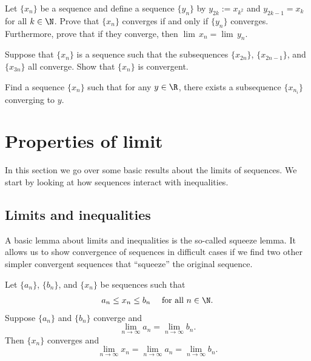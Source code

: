 \documentclass[12pt]{book}
\begin{document}
\begin{exercise}
Let $\{ x_n \}$ be a sequence and
define a sequence $\{ y_n \}$ by
$y_{2k} := x_{k^2}$ and $y_{2k-1} = x_k$ for all $k \in \N$.
Prove that $\{ x_n \}$ converges if and only if $\{ y_n \}$ converges.
Furthermore, prove that if they converge, then
$\lim\, x_n = \lim\, y_n$.
\end{exercise}

\begin{exercise}
Suppose that $\{ x_n \}$ is a sequence such that
the subsequences $\{ x_{2n} \}$, $\{ x_{2n-1} \}$, and
$\{ x_{3n} \}$ all converge.
Show that $\{ x_n \}$ is convergent.
\end{exercise}

\begin{exercise}
Find a sequence $\{ x_n \}$ such that for any $y \in \R$, there exists a
subsequence $\{ x_{n_i} \}$ converging to $y$.
\end{exercise}


\sectionnewpage
\section{Properties of limit}
\label{sec:factslimsseqs}


In this section we go over some basic results about the limits of
sequences.
We start by looking at how sequences interact with inequalities.

\subsection*{Limits and inequalities}

A basic lemma about limits and inequalities is the so-called squeeze lemma.
It allows us to show convergence of sequences in difficult cases
if we find two other simpler convergent sequences that 
``squeeze'' the original sequence.

\begin{lemma} \label{squeeze:lemma}
Let $\{ a_n \}$, 
$\{ b_n \}$, and 
$\{ x_n \}$ be sequences such that
\begin{equation*}
a_n \leq x_n \leq b_n \quad \text{ for all $n \in \N$} .
\end{equation*}
Suppose $\{ a_n \}$ and $\{ b_n \}$ converge and
\begin{equation*}
\lim_{n\to \infty} a_n
=
\lim_{n\to \infty} b_n .
\end{equation*}
Then $\{ x_n \}$ converges and
\begin{equation*}
\lim_{n\to \infty} x_n
=
\lim_{n\to \infty} a_n
=
\lim_{n\to \infty} b_n .
\end{equation*}
\end{lemma}
\end{document}
